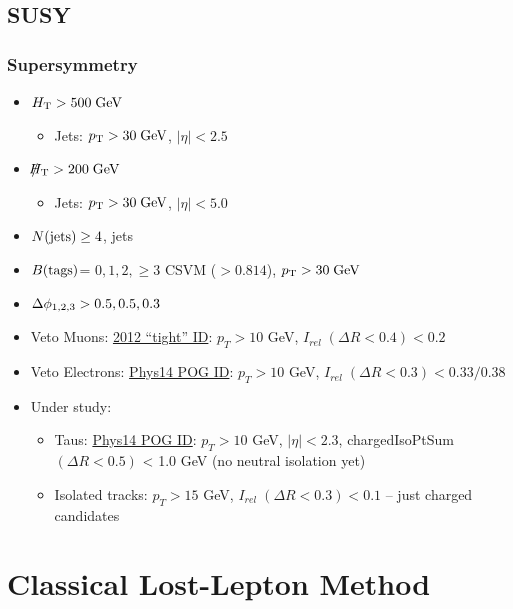 \documentclass{beamer}
\begin{document}
\subsection{SUSY}

\begin{frame}
\frametitle{Supersymmetry}
\normalsize
\begin{itemize}
 \item $H_{\text{T}} >500 \;\text{Ge}\kern-0.06667em\text{V}$
 \begin{itemize}
       \item Jets: $p_{\text{T}}>30\;\text{Ge}\kern-0.06667em\text{V}$, $|\eta|<2.5$
      \end{itemize}
 \item $\slash\mkern-12mu{H}_{\text{T}} >200 \;\text{Ge}\kern-0.06667em\text{V}$
  \begin{itemize}
       \item Jets: $p_{\text{T}}>30\;\text{Ge}\kern-0.06667em\text{V}$, $|\eta|<5.0$
      \end{itemize}
 \item $N(\text{jets})\ge 4$, \HT jets
 \item $B(\text{tags})$= {$0,1,2,\geq3$} CSVM ($>0.814$), $p_{\text{T}}>30\;\text{Ge}\kern-0.06667em\text{V}$
 \item $\Delta\phi_{1,2,3}>0.5,0.5,0.3$
\item Veto Muons: \href{https://twiki.cern.ch/twiki/bin/view/CMSPublic/SWGuideMuonId\#Tight\_Muon}{2012 ``tight'' ID}: $p_T > 10$ GeV, $I_{rel}\; (\Delta R<0.4) < 0.2$    
    \item Veto Electrons: \href{https://twiki.cern.ch/twiki/bin/viewauth/CMS/CutBasedElectronIdentificationRun2\#CSA14\_selection\_conditions\_25ns}{Phys14 POG ID}:  $p_T > 10$ GeV, $I_{rel}\;
      (\Delta R<0.3) < 0.33 / 0.38$
      \item Under study:
      \begin{itemize}


    \item Taus: \href{https://indico.cern.ch/event/359233/contribution/4/material/slides/0.pdf}{Phys14 POG ID}: $p_T > 10$ GeV, $|\eta| < 2.3$,
      chargedIsoPtSum $(\Delta R<0.5)$ < 1.0 GeV (no neutral isolation yet)
    \item Isolated tracks: $p_T > 15$ GeV, $I_{rel}\;(\Delta R<0.3) < 0.1$ -- just charged candidates
      \end{itemize}
\end{itemize}
\end{frame}


\section{Classical Lost-Lepton Method}
\end{document}
